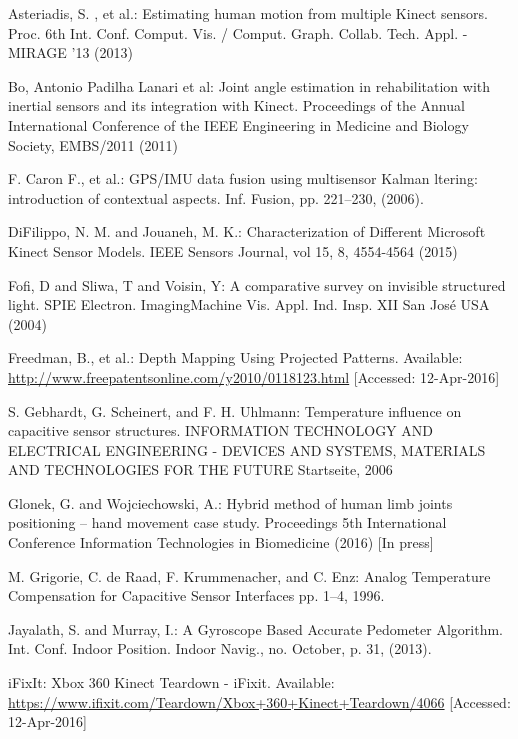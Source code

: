 \documentclass{llncs}
\begin{document}
		
\begin{thebibliography}{5}
	Asteriadis, S. , et al.:
	Estimating human motion from multiple Kinect sensors.
	Proc. 6th Int. Conf. Comput. Vis. / Comput. Graph. Collab. Tech. Appl. - MIRAGE '13 (2013)
		
	Bo, Antonio Padilha Lanari et al:
	Joint angle estimation in rehabilitation with inertial sensors and its integration with Kinect.
	Proceedings of the Annual International Conference of the IEEE Engineering in Medicine and Biology Society, EMBS/2011 (2011)
		
			F. Caron F., et al.: 
			GPS/IMU data fusion using multisensor Kalman ltering: introduction of contextual aspects. 
			Inf. Fusion, pp. 221–230, (2006).
			
	DiFilippo, N. M. and Jouaneh, M. K.:
	Characterization of Different Microsoft Kinect Sensor Models.
	IEEE Sensors Journal, vol 15, 8, 4554-4564 (2015)
			
	Fofi, D and Sliwa, T and Voisin, Y:
	A comparative survey on invisible structured light.
	SPIE Electron. ImagingMachine Vis. Appl. Ind. Insp. XII San Jos{\'{e}} USA (2004)
			
	Freedman, B., et al.:
	Depth Mapping Using Projected Patterns.
	Available: \url{http://www.freepatentsonline.com/y2010/0118123.html} [Accessed: 12-Apr-2016]
			
	S. Gebhardt, G. Scheinert, and F. H. Uhlmann:
	Temperature influence on capacitive sensor structures.
	INFORMATION TECHNOLOGY AND ELECTRICAL ENGINEERING - DEVICES AND SYSTEMS, MATERIALS AND TECHNOLOGIES FOR THE FUTURE Startseite, 2006
	
	Glonek, G. and Wojciechowski, A.:
	Hybrid method of human limb joints positioning -- hand movement case study.
	Proceedings 5th International Conference Information Technologies in Biomedicine (2016) [In press]
	
	M. Grigorie, C. de Raad, F. Krummenacher, and C. Enz:
	Analog Temperature Compensation for Capacitive Sensor Interfaces
	pp. 1–4, 1996.
		
		 Jayalath, S. and  Murray, I.: 
		 A Gyroscope Based Accurate Pedometer Algorithm.
		 Int. Conf. Indoor Position. Indoor Navig., no. October, p. 31, (2013).
		
	iFixIt:
	Xbox 360 Kinect Teardown - iFixit.
	Available: \url{https://www.ifixit.com/Teardown/Xbox+360+Kinect+Teardown/4066} [Accessed: 12-Apr-2016]


\end{thebibliography}
\end{document}
